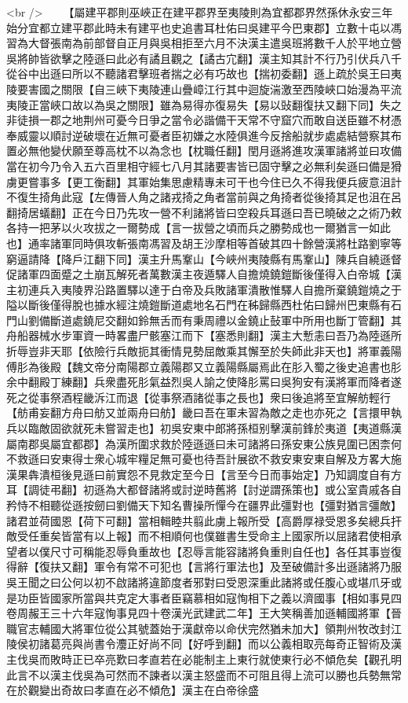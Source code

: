 <br />
　　【屬建平郡則巫峽正在建平郡界至夷陵則為宜都郡界然孫休永安三年始分宜都立建平郡此時未有建平也史追書耳杜佑曰吳建平今巴東郡】立數十屯以馮習為大督張南為前部督自正月與吳相拒至六月不決漢主遣吳班將數千人於平地立營吳將帥皆欲擊之陸遜曰此必有譎且觀之【譎古宂翻】漢主知其計不行乃引伏兵八千從谷中出遜曰所以不聽諸君擊班者揣之必有巧故也【揣初委翻】遜上疏於吳王曰夷陵要害國之關限【自三峽下夷陵連山疊嶂江行其中迴旋湍激至西陵峽口始漫為平流夷陵正當峽口故以為吳之關限】雖為易得亦復易失【易以䜴翻復扶又翻下同】失之非徒損一郡之地荆州可憂今日爭之當令必諧備干天常不守窟穴而敢自送臣雖不材憑奉威靈以順討逆破壞在近無可憂者臣初嫌之水陸俱進今反捨船就步處處結營察其布置必無他變伏願至尊高枕不以為念也【枕職任翻】閏月遜將進攻漢軍諸將並曰攻備當在初今乃令入五六百里相守經七八月其諸要害皆已固守擊之必無利矣遜曰備是猾虜更嘗事多【更工衡翻】其軍始集思慮精專未可干也今住已久不得我便兵疲意沮計不復生掎角此寇【左傳晉人角之諸戎掎之角者當前與之角掎者從後掎其足也沮在呂翻掎居蟻翻】正在今日乃先攻一營不利諸將皆曰空殺兵耳遜曰吾已曉破之之術乃敕各持一把茅以火攻拔之一爾勢成【言一拔營之頃而兵之勝勢成也一爾猶言一如此也】通率諸軍同時俱攻斬張南馮習及胡王沙摩相等首破其四十餘營漢將杜路劉寧等窮逼請降【降戶江翻下同】漢主升馬鞌山【今峽州夷陵縣有馬鞌山】陳兵自繞遜督促諸軍四面蹙之土崩瓦解死者萬數漢主夜遁驛人自擔燒鐃鎧斷後僅得入白帝城【漢主初連兵入夷陵界沿路置驛以達于白帝及兵敗諸軍潰散惟驛人自擔所棄鐃鎧燒之于隘以斷後僅得脫也據水經注燒鎧斷道處地名石門在秭歸縣西杜佑曰歸州巴東縣有石門山劉備斷道處鐃尼交翻如鈴無舌而有秉周禮以金鐃止鼔軍中所用也斷丁管翻】其舟船器械水步軍資一時畧盡尸骸塞江而下【塞悉則翻】漢主大慙恚曰吾乃為陸遜所折辱豈非天耶【依險行兵敵扼其衝情見勢屈敵乘其懈至於失師此非天也】將軍義陽傅肜為後殿【魏文帝分南陽郡立義陽郡又立義陽縣屬焉此在肜入蜀之後史追書也肜余中翻殿丁練翻】兵衆盡死肜氣益烈吳人諭之使降肜罵曰吳狗安有漢將軍而降者遂死之從事祭酒程畿泝江而退【從事祭酒諸從事之長也】衆曰後追將至宜解舫輕行【舫甫妄翻方舟曰舫又並兩舟曰舫】畿曰吾在軍未習為敵之走也亦死之【言擐甲執兵以臨敵固欲就死未嘗習走也】初吳安東中郎將孫桓别擊漢前鋒於夷道【夷道縣漢屬南郡吳屬宜都郡】為漢所圍求救於陸遜遜曰未可諸將曰孫安東公族見圍已困柰何不救遜曰安東得士衆心城牢糧足無可憂也待吾計展欲不救安東安東自解及方畧大施漢果犇潰桓後見遜曰前實怨不見救定至今日【言至今日而事始定】乃知調度自有方耳【調徒弔翻】初遜為大都督諸將或討逆時舊將【討逆謂孫策也】或公室貴戚各自矜恃不相聽從遜按劒曰劉備天下知名曹操所憚今在疆界此彊對也【彊對猶言彊敵】諸君並荷國恩【荷下可翻】當相輯睦共翦此虜上報所受【高爵厚禄受恩多矣總兵扞敵受任重矣皆當有以上報】而不相順何也僕雖書生受命主上國家所以屈諸君使相承望者以僕尺寸可稱能忍辱負重故也【忍辱言能容諸將負重則自任也】各任其事豈復得辭【復扶又翻】軍令有常不可犯也【言將行軍法也】及至破備計多出遜諸將乃服吳王聞之曰公何以初不啟諸將違節度者邪對曰受恩深重此諸將或任腹心或堪爪牙或是功臣皆國家所當與共克定大事者臣竊慕相如寇恂相下之義以濟國事【相如事見四卷周赧王三十六年寇恂事見四十卷漢光武建武二年】王大笑稱善加遜輔國將軍【晉職官志輔國大將軍位從公其號蓋始于漢獻帝以命伏完然猶未加大】領荆州牧改封江陵侯初諸葛亮與尚書令灋正好尚不同【好呼到翻】而以公義相取亮每奇正智術及漢主伐吳而敗時正已卒亮歎曰孝直若在必能制主上東行就使東行必不傾危矣【觀孔明此言不以漢主伐吳為可然而不諫者以漢主怒盛而不可阻且得上流可以勝也兵勢無常在於觀變出奇故曰孝直在必不傾危】漢主在白帝徐盛